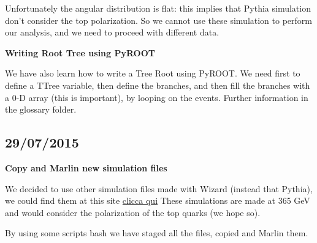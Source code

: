Unfortunately the angular distribution is flat: this implies that Pythia simulation don't consider the top polarization. So we cannot use these simulation to perform our analysis, and we need to proceed with different data.

\textbf{Writing Root Tree using PyROOT}

We have also learn how to write a Tree Root using PyROOT. We need first to define a TTree variable, then define the branches, and then fill the branches with a 0-D array (this is important), by looping on the events.
Further information in the glossary folder.

\subsection{29/07/2015}

\textbf{Copy and Marlin new simulation files}

We decided to use other simulation files made with Wizard (instead that Pythia), we could find them at this site \href{https://twiki.cern.ch/twiki/bin/view/CLIC/MonteCarloSamplesForTopPhysics?sortcol=2;table=3;up=1#sorted_table.}{clicca qui}
These simulations are made at 365 GeV and would consider the polarization of the top quarks (we hope so).

By using some scripts bash we have staged all the files, copied and Marlin them.